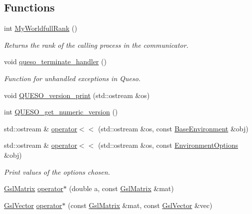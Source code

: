 \subsection*{Functions}
\begin{DoxyCompactItemize}
\item 
int \hyperlink{namespace_q_u_e_s_o_a5af97e1f9320b7787efc744ef76be297}{My\-Worldfull\-Rank} ()
\begin{DoxyCompactList}\small\item\em Returns the rank of the calling process in the communicator. \end{DoxyCompactList}\item 
void \hyperlink{namespace_q_u_e_s_o_a97e263e01a0ff9fad14de6a8840b007e}{queso\-\_\-terminate\-\_\-handler} ()
\begin{DoxyCompactList}\small\item\em Function for unhandled exceptions in Queso. \end{DoxyCompactList}\item 
void \hyperlink{namespace_q_u_e_s_o_ae2e4805bfcc226b2ceb17c8a8dbb1297}{Q\-U\-E\-S\-O\-\_\-version\-\_\-print} (std\-::ostream \&os)
\item 
int \hyperlink{namespace_q_u_e_s_o_a61ed284ac8a5002856025bf21955b215}{Q\-U\-E\-S\-O\-\_\-get\-\_\-numeric\-\_\-version} ()
\item 
std\-::ostream \& \hyperlink{namespace_q_u_e_s_o_ae007c2d003b9f75b31b073ececd3120a}{operator$<$$<$} (std\-::ostream \&os, const \hyperlink{class_q_u_e_s_o_1_1_base_environment}{Base\-Environment} \&obj)
\item 
std\-::ostream \& \hyperlink{namespace_q_u_e_s_o_a19108ba91686fa96e00f6f47bed7c67f}{operator$<$$<$} (std\-::ostream \&os, const \hyperlink{class_q_u_e_s_o_1_1_environment_options}{Environment\-Options} \&obj)
\begin{DoxyCompactList}\small\item\em Print values of the options chosen. \end{DoxyCompactList}\item 
\hyperlink{class_q_u_e_s_o_1_1_gsl_matrix}{Gsl\-Matrix} \hyperlink{namespace_q_u_e_s_o_a1fa0d79f37a4fccc4c307456d29c4bfa}{operator$\ast$} (double a, const \hyperlink{class_q_u_e_s_o_1_1_gsl_matrix}{Gsl\-Matrix} \&mat)
\item 
\hyperlink{class_q_u_e_s_o_1_1_gsl_vector}{Gsl\-Vector} \hyperlink{namespace_q_u_e_s_o_a87c02837d212969d66ae52ac73d0e301}{operator$\ast$} (const \hyperlink{class_q_u_e_s_o_1_1_gsl_matrix}{Gsl\-Matrix} \&mat, const \hyperlink{class_q_u_e_s_o_1_1_gsl_vector}{Gsl\-Vector} \&vec)

\end{DoxyCompactItemize}
